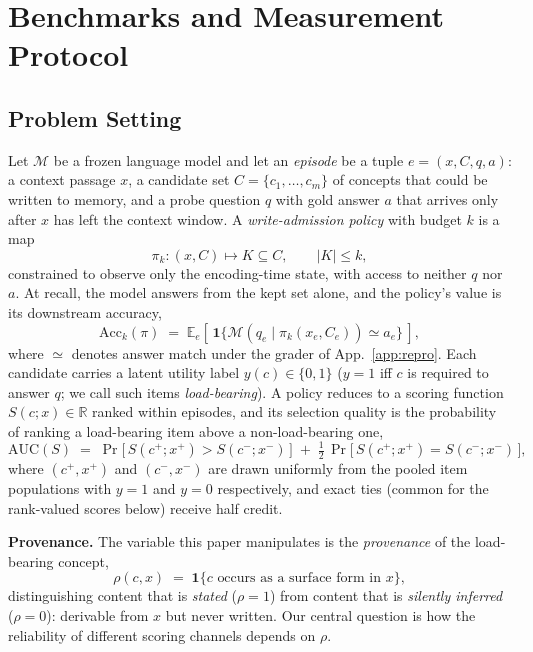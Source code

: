 \section{Benchmarks and Measurement Protocol}
\label{sec:setup}

\subsection{Problem Setting}
\label{sec:problem}

Let $\mathcal{M}$ be a frozen language model and let an \emph{episode} be a
tuple $e=(x, C, q, a)$: a context passage $x$, a candidate set
$C=\{c_1,\dots,c_m\}$ of concepts that could be written to memory, and a probe
question $q$ with gold answer $a$ that arrives only after $x$ has left the
context window. A \emph{write-admission policy} with budget $k$ is a map
\begin{equation}
\pi_k : (x, C) \mapsto K \subseteq C, \qquad |K| \le k,
\label{eq:policy}
\end{equation}
constrained to observe only the encoding-time state, with access to neither
$q$ nor $a$.
At recall, the model answers from the kept set alone, and the policy's value is
its downstream accuracy,
\begin{equation}
\mathrm{Acc}_k(\pi) \;=\; \mathbb{E}_{e}\!\left[\,
\mathbf{1}\{\mathcal{M}(q_e \mid \pi_k(x_e, C_e)) \simeq a_e\}\,\right],
\label{eq:acc}
\end{equation}
where $\simeq$ denotes answer match under the grader of App.~\ref{app:repro}.
Each candidate carries a latent utility label $y(c)\in\{0,1\}$ ($y{=}1$ iff $c$
is required to answer $q$; we call such items \emph{load-bearing}). A policy
reduces to a scoring function $S(c; x)\in\mathbb{R}$ ranked within episodes,
and its selection quality is the probability of ranking a load-bearing item
above a non-load-bearing one,
\begin{equation}
\mathrm{AUC}(S) \;=\; \Pr\big[\,S(c^{+}; x^{+}) > S(c^{-}; x^{-})\,\big]
\;+\; \tfrac{1}{2}\,\Pr\big[\,S(c^{+}; x^{+}) = S(c^{-}; x^{-})\,\big],
\label{eq:auc}
\end{equation}
where $(c^{+}, x^{+})$ and $(c^{-}, x^{-})$ are drawn uniformly from the pooled
item populations with $y{=}1$ and $y{=}0$ respectively, and exact ties (common
for the rank-valued scores below) receive half credit.

\textbf{Provenance.} The variable this paper manipulates is the
\emph{provenance} of the load-bearing concept,
\begin{equation}
\rho(c, x) \;=\; \mathbf{1}\{\text{$c$ occurs as a surface form in } x\},
\label{eq:provenance}
\end{equation}
distinguishing content that is \emph{stated} ($\rho{=}1$) from content that is
\emph{silently inferred} ($\rho{=}0$): derivable from $x$ but never written.
Our central question is how the reliability of different scoring channels
depends on $\rho$.

